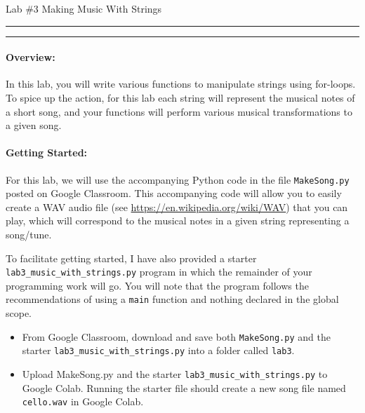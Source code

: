 \documentclass[10pt]{article}
\begin{document}
  \thispagestyle{empty}
  \def\cpp{C{\tt ++}\xspace}

  \begin{bf}
      Lab \#3
      \hfill 
      Making Music With Strings
      \hfill
  \end{bf}

  \vspace*{10pt} \hrule \vspace*{1pt} \hrule

  \vspace*{-10pt}
  \paragraph{Overview:} 

  \newcommand{\prog}{{\tt lab3\_music\_with\_strings.py}\xspace}

  In this lab, you will write various functions to manipulate strings using
  for-loops.  
  To spice up the action, for this lab each string will represent the musical
  notes of a short song, and your functions will perform various musical
  transformations to a given song.  

  \vspace*{-20pt}
  
  \vspace*{-15pt}
  \paragraph{Getting Started:}
    For this lab, we will use the accompanying Python code in
    the file {\tt MakeSong.py} posted on Google Classroom.
    This accompanying code will allow you to easily create a WAV audio file
    (see \url{https://en.wikipedia.org/wiki/WAV}) that you can play, which will
    correspond to the musical notes in a given string representing a song/tune.

    To facilitate getting started, I have also provided a starter 
    \prog
    program in which the remainder of your
    programming work will go.
    You will note that the program follows the recommendations of using a {\tt main}
    function and nothing declared in the global scope.

    \vspace*{-6pt}
    \begin{itemize}
        \item From Google Classroom, download and save both {\tt MakeSong.py} and the
            starter \prog into a folder called {\tt lab3}.
        \item Upload MakeSong.py and the starter \prog to Google Colab. Running the starter file
            should create a new song file named {\tt cello.wav} in Google Colab.
    \end{itemize}
\end{document}
